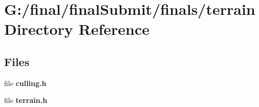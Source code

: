 \section{G\-:/final/final\-Submit/finals/terrain Directory Reference}
\label{dir_5dd64ba82a6d3d98bfdbd457503c6a18}
\subsection*{Files}
\begin{DoxyCompactItemize}
\item 
file {\bf culling.\-h}
\item 
file {\bf terrain.\-h}
\end{DoxyCompactItemize}

